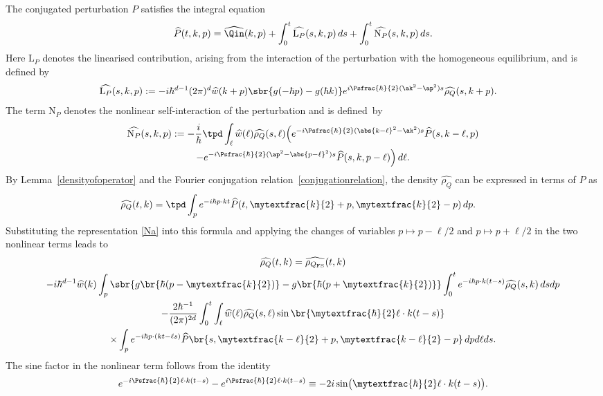The conjugated perturbation $P$ satisfies the integral equation
\begin{align}\label{Na}
\widehat P(t,k,p)=\widehat{\Qin}(k,p)+\int_0^t \widehat {\mathrm{L}_P}(s,k,p)\,ds+\int_0^t\widehat{\mathrm{N}_P}(s,k,p)\,ds.
\end{align}
Here $\mathrm{L}_P$ denotes the linearised contribution, arising from the interaction of the perturbation with the homogeneous equilibrium, and is defined by
\begin{align*}
\widehat {\mathrm{L}_P}(s,k,p)&:=-i\hbar^{d-1}(2\pi)^d\widehat w(k+p)\sbr{g(-\hbar p)-g(\hbar k)}e^{i{\Psfrac{\hbar}{2}}(\ak^2-\ap^2)s}\widehat{\rho_Q}(s,k+p).
\end{align*}The term $\mathrm{N}_P$ denotes the nonlinear self-interaction of the perturbation and is defined~by
\begin{multline*}
\widehat{\mathrm{N}_P}(s,k,p):=-\frac{i}{\hbar}\tpd\int_\ell \widehat w(\ell )\widehat{\rho_Q}(s,\ell )\Big(e^{-i\Psfrac{\hbar}{2}(\abs{k-\ell }^2-\ak^2)s}\widehat{P}(s,k-\ell ,p)\\
-e^{-i\Psfrac{\hbar}{2}(\ap^2-\abs{p-\ell }^2)s}\widehat P(s,k,p-\ell)\Big)\,d\ell.
\end{multline*}
By Lemma~\ref{densityofoperator} and the Fourier conjugation relation~\eqref{conjugationrelation}, the density
$\widehat{\rho_Q}$ can be expressed in terms of $P$ as
\begin{align}\label{rhoQintermsofP}
\widehat{\rho_Q}(t,k)&=\tpd\int_p e^{-i\hbar p\cdot kt}\widehat P(t,\mytextfrac{k}{2}+p,\mytextfrac{k}{2}-p)\,dp.
\end{align} Substituting the representation \eqref{Na} into this formula and applying the changes of variables \( p \mapsto p - \ell/2 \) and \( p \mapsto p + \ell/2 \) in the two nonlinear terms leads to
\begin{multline}\label{Nb}
\widehat{\rho_Q}(t,k)=\widehat{\rho_{{Q_{\mathrm{FS}}}}}(t,k)\\
-i\hbar^{d-1}\widehat w(k)\int_p\sbr{g\br{\hbar(p-\mytextfrac{k}{2})}-g\br{\hbar(p+\mytextfrac{k}{2})}}\int_0^te^{-i\hbar p\cdot k(t-s)}\widehat{\rho_Q}(s,k)\,dsdp\\
-\frac{2\hbar^{-1}}{(2\pi)^{2d}}\int_0^t\int_\ell\widehat w(\ell)\widehat{\rho_Q}(s,\ell) \sin\br{\mytextfrac{\hbar}{2}\ell\cdot k(t-s)}\\
\times\int_p e^{-i\hbar p\cdot(kt-\ell s)}\widehat P\br{s,\mytextfrac{k-\ell}{2}+p,\mytextfrac{k-\ell}{2}-p}\,dpd\ell ds.
\end{multline}
The sine factor in the nonlinear term follows from the identity
\[
e^{-i\Psfrac{\hbar}{2}\ell\cdot k(t-s)} - e^{i\Psfrac{\hbar}{2}\ell\cdot k(t-s)} \equiv -2i\sin\bigl(\mytextfrac{\hbar}{2}\ell\cdot k(t-s)\bigr).
\]

